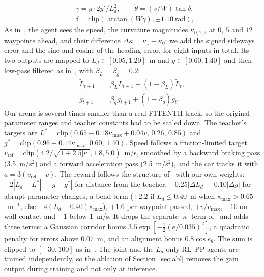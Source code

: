 \documentclass[conference]{IEEEtran}
\begin{document}
\begin{equation}
\begin{aligned}
&\gamma=g\cdot2y'/L_d^2,\qquad \dot\theta=(v/W)\tan\delta,\\
&\delta=\mathrm{clip}(\arctan(W\gamma),\pm1.10~\mathrm{rad}),
\end{aligned}\label{eq:pp}
\end{equation}
As in~\cite{elgouhary2026}, the agent sees the speed, the curvature magnitudes $\kappa_{0,1,2}$ at $0$, $5$ and $12$ waypoints ahead, and their difference $\Delta\kappa=\kappa_1-\kappa_0$; we add the signed sideways error and the sine and cosine of the heading error, for eight inputs in total. Its two outputs are mapped to $L_d\in[0.05,1.20]$~m and $g\in[0.60,1.40]$ and then low-pass filtered as in~\cite{elgouhary2026}, with $\beta_L=\beta_g=0.2$:
\begin{equation}
\begin{aligned}
\tilde L_{t+1}&=\beta_L L_{t+1}+(1-\beta_L)\tilde L_t,\\
\tilde g_{t+1}&=\beta_g g_{t+1}+(1-\beta_g)\tilde g_t.
\end{aligned}\label{eq:smooth}
\end{equation}
Our arena is several times smaller than a real F1TENTH track, so the original parameter ranges and teacher constants had to be scaled down. The teacher's targets are $L^{*}=\mathrm{clip}(0.65-0.18\kappa_{\max}+0.04v,\,0.26,\,0.85)$ and $g^{*}=\mathrm{clip}(0.96+0.14\kappa_{\max},\,0.60,\,1.40)$. Speed follows a friction-limited target $v_{\mathrm{ref}}=\mathrm{clip}(4.2/\sqrt{1+2.5|\kappa|},1.8,5.0)$~m/s, smoothed by a backward braking pass (3.5~m/s$^2$) and a forward acceleration pass (2.5~m/s$^2$), and the car tracks it with $a=3(v_{\mathrm{ref}}-v)$. The reward follows the structure of~\cite{elgouhary2026} with our own weights: $-2|L_d-L^{*}|-|g-g^{*}|$ for distance from the teacher, $-0.25|\Delta L_d|-0.10|\Delta g|$ for abrupt parameter changes, a bend term ($+2.2$ if $L_d\le0.40$~m when $\kappa_{\max}>0.65$~m$^{-1}$, else $-4(L_d-0.40)\kappa_{\max}$), $+1.6$ per waypoint passed, $+v/v_{\max}$, $-10$ on wall contact and $-1$ below 1~m/s. It drops the separate $|\kappa|$ term of~\cite{elgouhary2026} and adds three terms: a Gaussian corridor bonus $3.5\exp[-\frac12(e/0.035)^2]$, a quadratic penalty for errors above 0.07~m, and an alignment bonus $0.8\cos e_\theta$. The sum is clipped to $[-30,100]$ as in~\cite{elgouhary2026}. The joint and the $L_d$-only RL--PP agents are trained independently, so the ablation of Section~\ref{sec:abl} removes the gain output during training and not only at inference.
\end{document}

